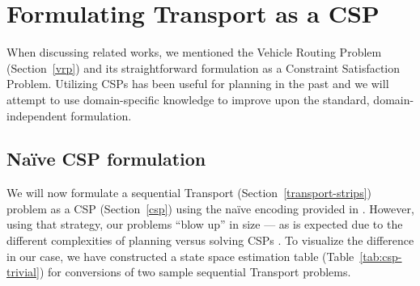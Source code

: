 \section{Formulating Transport as a CSP}\label{csp-formulation}

When discussing related works, we mentioned the Vehicle Routing Problem (Section~\ref{vrp}) and its straightforward
formulation as a Constraint Satisfaction Problem. Utilizing CSPs has been useful
for planning in the past \citep[Section~8.7]{Ghallab2004}
and we will attempt to use domain-specific knowledge to improve upon the standard, domain-independent
formulation.

\subsection{Na{\"{i}}ve CSP formulation}

We will now formulate a sequential Transport (Section~\ref{transport-strips}) problem as a CSP (Section~\ref{csp}) using the na{\"{i}}ve encoding provided in \citet[Section~8.3]{Ghallab2004}.
However, using that strategy, our problems ``blow up'' in size --- as is expected due
to the different complexities of planning versus solving CSPs \citep[Section~8.3.2]{Ghallab2004}. To visualize the difference in our case, we have constructed a state space estimation table (Table~\ref{tab:csp-trivial}) for conversions of two sample sequential Transport problems.

